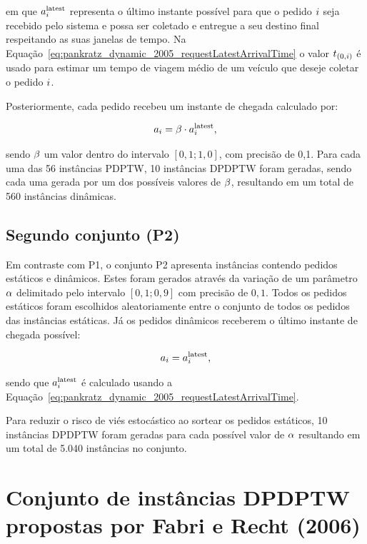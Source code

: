 em que $a{}_{i{}}^{\mathrm{latest}}$ representa o último instante possível para
que o pedido $i$ seja recebido pelo sistema e possa ser coletado e
entregue a seu destino final respeitando as suas janelas de tempo.
Na Equação~\ref{eq:pankratz_dynamic_2005_requestLatestArrivalTime} o valor
$t_{(0,i)}$ é usado para estimar um tempo de 
viagem médio de um veículo que deseje coletar o pedido $i$.

Posteriormente, cada pedido recebeu um instante de chegada calculado por: 

\begin{equation}
  a_i = \beta \cdot a{}_{i{}}^{\mathrm{latest}}, 
\end{equation}

sendo $\beta$ um valor dentro do intervalo $[0,1; 1,0]$, com precisão 
de 0,1. 
Para cada uma das 56 instâncias PDPTW, 10 instâncias DPDPTW foram geradas, 
sendo cada uma gerada por um dos possíveis valores de $\beta$,
resultando em um total de 560 instâncias dinâmicas.

\subsection{Segundo conjunto (P2)}
Em contraste com P1, o conjunto P2 apresenta instâncias contendo pedidos 
estáticos e dinâmicos. 
Estes foram gerados através da variação de um parâmetro $\alpha$ 
delimitado pelo intervalo $[0,1; 0,9]$ com precisão de $0,1$.
Todos os pedidos estáticos foram escolhidos aleatoriamente entre o conjunto de 
todos os pedidos das instâncias estáticas. Já os pedidos dinâmicos receberem o 
último instante de chegada possível:

\begin{equation}
  a_i = a{}_{i{}}^{\mathrm{latest}},
\end{equation}

sendo que $a{}_{i{}}^{\mathrm{latest}}$ é calculado usando a
Equação~\ref{eq:pankratz_dynamic_2005_requestLatestArrivalTime}.

Para reduzir o risco de viés estocástico ao sortear os pedidos estáticos, 10 
instâncias DPDPTW foram geradas para cada possível valor de $\alpha$
resultando em um total de 5.040 instâncias no conjunto.






\section{Conjunto de instâncias DPDPTW propostas por 
         Fabri e Recht (2006)}

